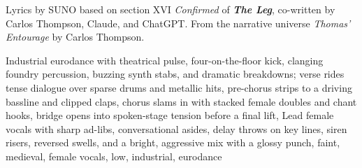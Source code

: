 
\begin{notes}
Lyrics by SUNO based on section XVI \emph{Confirmed} of \emph{\bfseries The Leg}, %
co-written by Carlos Thompson, Claude, and ChatGPT. %
From the narrative universe \emph{Thomas’ Entourage} by Carlos Thompson.
\end{notes}
\begin{style}
Industrial eurodance with theatrical pulse, four-on-the-floor kick, clanging foundry percussion, buzzing synth stabs, and dramatic breakdowns; verse rides tense dialogue over sparse drums and metallic hits, pre-chorus strips to a driving bassline and clipped claps, chorus slams in with stacked female doubles and chant hooks, bridge opens into spoken-stage tension before a final lift, Lead female vocals with sharp ad-libs, conversational asides, delay throws on key lines, siren risers, reversed swells, and a bright, aggressive mix with a glossy punch, faint, medieval, female vocals, low, industrial, eurodance
\end{style}
